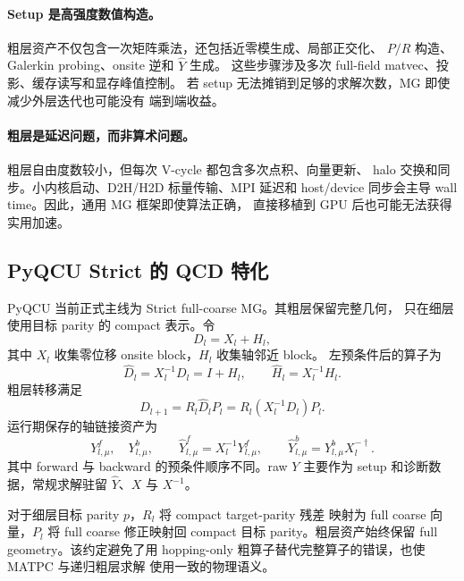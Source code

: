 \documentclass[UTF8,a4paper,11pt,fontset=none]{ctexart}
\numberwithin{equation}{section}
\numberwithin{figure}{section}
\numberwithin{table}{section}
\begin{document}
\paragraph{Setup 是高强度数值构造。}
粗层资产不仅包含一次矩阵乘法，还包括近零模生成、局部正交化、
\(P/R\) 构造、Galerkin probing、onsite 逆和 \(\widehat Y\) 生成。
这些步骤涉及多次 full-field matvec、投影、缓存读写和显存峰值控制。
若 setup 无法摊销到足够的求解次数，MG 即使减少外层迭代也可能没有
端到端收益。

\paragraph{粗层是延迟问题，而非算术问题。}
粗层自由度数较小，但每次 V-cycle 都包含多次点积、向量更新、
halo 交换和同步。小内核启动、D2H/H2D 标量传输、MPI 延迟和
host/device 同步会主导 wall time。因此，通用 MG 框架即使算法正确，
直接移植到 GPU 后也可能无法获得实用加速。

\subsection{PyQCU Strict 的 QCD 特化}

PyQCU 当前正式主线为 Strict full-coarse MG。其粗层保留完整几何，
只在细层使用目标 parity 的 compact 表示。令
\begin{equation}
 D_l=X_l+H_l,
\label{eq:strict-split}
\end{equation}
其中 \(X_l\) 收集零位移 onsite block，\(H_l\) 收集轴邻近 block。
左预条件后的算子为
\begin{equation}
 \widehat D_l=X_l^{-1}D_l=I+\widehat H_l,
\qquad
 \widehat H_l=X_l^{-1}H_l.
\label{eq:strict-preconditioned}
\end{equation}
粗层转移满足
\begin{equation}
 D_{l+1}=R_l\widehat D_lP_l
 =R_l\left(X_l^{-1}D_l\right)P_l.
\label{eq:strict-galerkin}
\end{equation}
运行期保存的轴链接资产为
\begin{equation}
 Y^{f}_{l,\mu},\quad Y^{b}_{l,\mu},
\qquad
 \widehat Y^{f}_{l,\mu}=X_l^{-1}Y^{f}_{l,\mu},
\qquad
 \widehat Y^{b}_{l,\mu}=Y^{b}_{l,\mu}X_l^{-\dagger}.
\label{eq:yhat}
\end{equation}
其中 forward 与 backward 的预条件顺序不同。raw \(Y\) 主要作为 setup
和诊断数据，常规求解驻留 \(\widehat Y\)、\(X\) 与 \(X^{-1}\)。

对于细层目标 parity \(p\)，\(R_l\) 将 compact target-parity 残差
映射为 full coarse 向量，\(P_l\) 将 full coarse 修正映射回 compact
目标 parity。粗层资产始终保留 full geometry。该约定避免了用
hopping-only 粗算子替代完整算子的错误，也使 MATPC 与递归粗层求解
使用一致的物理语义。
\end{document}
